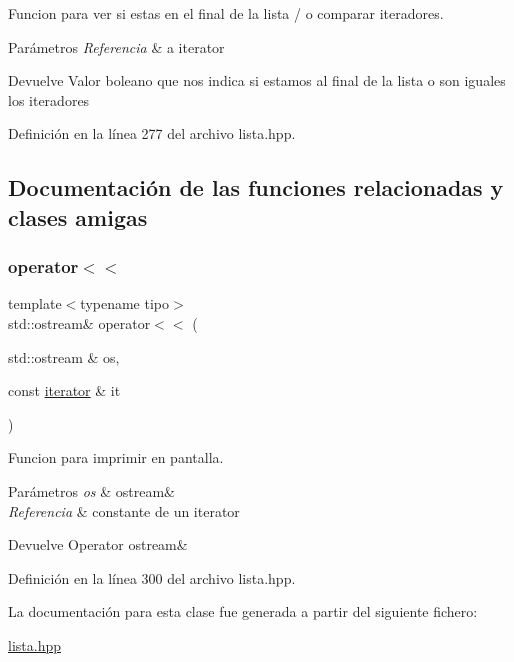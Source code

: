 Funcion para ver si estas en el final de la lista / o comparar iteradores. 


\begin{DoxyParams}{Parámetros}
{\em Referencia} & a iterator \\
\hline
\end{DoxyParams}
\begin{DoxyReturn}{Devuelve}
Valor boleano que nos indica si estamos al final de la lista o son iguales los iteradores 
\end{DoxyReturn}


Definición en la línea 277 del archivo lista.\+hpp.



\subsection{Documentación de las funciones relacionadas y clases amigas}
\mbox{\label{classLista_1_1iterator_ab86d5cacfaca06c9075ddb7427cf7ddb}} 
\subsubsection{\texorpdfstring{operator$<$$<$}{operator<<}}
{\footnotesize\ttfamily template$<$typename tipo$>$ \\
std\+::ostream\& operator$<$$<$ (\begin{DoxyParamCaption}\item[{std\+::ostream \&}]{os,  }\item[{const \hyperlink{classLista_1_1iterator}{iterator} \&}]{it }\end{DoxyParamCaption})\hspace{0.3cm}{\ttfamily [friend]}}



Funcion para imprimir en pantalla. 


\begin{DoxyParams}{Parámetros}
{\em os} & ostream\& \\
\hline
{\em Referencia} & constante de un iterator \\
\hline
\end{DoxyParams}
\begin{DoxyReturn}{Devuelve}
Operator ostream\& 
\end{DoxyReturn}


Definición en la línea 300 del archivo lista.\+hpp.



La documentación para esta clase fue generada a partir del siguiente fichero\+:\begin{DoxyCompactItemize}
\item 
\hyperlink{lista_8hpp}{lista.\+hpp}\end{DoxyCompactItemize}
